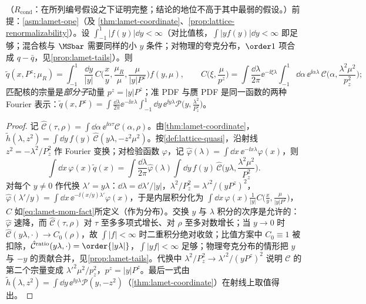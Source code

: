 \begin{theorem}\label{thm:lamet-parton-momentum}
（$R_{\mathrm{cond}}$：在所列编号假设之下证明完整；结论的地位不高于其中最弱的假设。）前提：\cref{asm:lamet-ope}（及 \cref{thm:lamet-coordinate}、\cref{prop:lattice-renormalizability}）。设 $\int_{-1}^1|f(y)|\dd y<\infty$（对比值核，$\int|yf(y)|\dd y<\infty$ 即足够；混合核与 $\MSbar$ 需要同样的小 $y$ 条件；对物理的夸克分布，$\order1$ 项合成 $q-\bar q$，见\cref{prop:lamet-tails}）。则
\begin{equation}\label{eq:lamet-mom-fact}
\tilde q(x,P^z;\mu_R)=\int_{-1}^1\frac{\dd y}{|y|}\,C\Big(\frac xy,\frac{\mu_R}\mu,\frac\mu{|y|P^z}\Big)f(y,\mu),\qquad
C\Big(\xi,\frac\mu{p^z}\Big)=\int\frac{\dd\lambda}{2\pi}\ee^{-\ii\xi\lambda}\int_{-1}^1\dd\alpha\,\ee^{\ii\alpha\lambda}\,\mathcal C\Big(\alpha,\frac{\lambda^2\mu^2}{p_z^2}\Big);
\end{equation}%
匹配核的宗量是\emph{部分子}动量 $p^z=|y|P^z$；准 PDF 与赝 PDF 是同一函数的两种 Fourier 表示：$\tilde q(x,P^z)=\int\frac{\dd\lambda}{2\pi}\ee^{-\ii x\lambda}\int_{-1}^1\dd y\,\ee^{\ii y\lambda}\mathcal P\big(y,\frac{\lambda^2}{P_z^2}\big)$。
\end{theorem}

\begin{proof}
记 $\hat{\mathcal C}(\tau,\rho)=\int\dd\alpha\,\ee^{\ii\alpha\tau}\mathcal C(\alpha,\rho)$。由\cref{thm:lamet-coordinate}，$\tilde h(\lambda,z^2)=\int\dd y\,f(y)\,\hat{\mathcal C}(y\lambda,-z^2\mu^2)$。按\cref{def:lattice-quasi}，沿射线 $z^2=-\lambda^2/P_z^2$ 作 Fourier 变换；对检验函数 $\varphi$，记 $\hat\varphi(\lambda)=\int\dd x\,\ee^{-\ii x\lambda}\varphi(x)$，则
\[
\int\dd x\,\varphi(x)\tilde q(x)=\int\frac{\dd\lambda}{2\pi}\hat\varphi(\lambda)\int\dd y\,f(y)\,\hat{\mathcal C}\Big(y\lambda,\frac{\lambda^2\mu^2}{P_z^2}\Big).
\]
对每个 $y\neq0$ 作代换 $\lambda'=y\lambda$：$\dd\lambda=\dd\lambda'/|y|$，$\lambda^2/P_z^2=\lambda'^2/(yP^z)^2$，$\hat\varphi(\lambda'/y)=\int\dd x\,\ee^{-\ii(x/y)\lambda'}\varphi(x)$，于是内层积分化为 $\int\dd x\,\varphi(x)\frac1{|y|}C\big(\frac xy,\frac\mu{|y|P^z}\big)$，$C$ 如\cref{eq:lamet-mom-fact}所定义（作为分布）。交换 $y$ 与 $\lambda$ 积分的次序是允许的：$\hat\varphi$ 速降，而 $\hat{\mathcal C}(\tau,\rho)$ 对 $\tau$ 至多多项式增长、对 $\rho$ 至多对数增长；当 $y\to0$ 时 $\hat{\mathcal C}(y\lambda,\cdot)\to C_0(\rho)$，故 $\int|f|<\infty$ 时二重积分绝对收敛；比值方案中 $C_0\equiv1$ 被扣除，$\hat{\mathcal C}^{\rm ratio}(y\lambda,\cdot)=\order{|y\lambda|}$，$\int|yf|<\infty$ 足够；物理夸克分布的情形把 $y$ 与 $-y$ 的贡献合并，见\cref{prop:lamet-tails}。代换中 $\lambda^2/P_z^2\to\lambda'^2/(yP^z)^2$ 说明 $\mathcal C$ 的第二个宗量变成 $\lambda'^2\mu^2/p_z^2$，$p^z=|y|P^z$。最后一式由 $\tilde h(\lambda,z^2)=\int\dd y\,\ee^{\ii y\lambda}\mathcal P(y,-z^2)$（\cref{thm:lamet-coordinate}）在射线上取值得出。
\end{proof}

